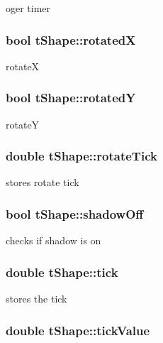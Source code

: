 oger timer \hypertarget{classt_shape_a502388884d8386251696471623158a76}{
\subsubsection[{rotated\-X}]{\setlength{\rightskip}{0pt plus 5cm}bool t\-Shape\-::rotated\-X}}\label{classt_shape_a502388884d8386251696471623158a76}
rotate\-X \hypertarget{classt_shape_a2bafbe715483f3f4da44eafae17aac5f}{
\subsubsection[{rotated\-Y}]{\setlength{\rightskip}{0pt plus 5cm}bool t\-Shape\-::rotated\-Y}}\label{classt_shape_a2bafbe715483f3f4da44eafae17aac5f}
rotate\-Y \hypertarget{classt_shape_ad7f4f8ddfe299bf838030cbc521acb6f}{
\subsubsection[{rotate\-Tick}]{\setlength{\rightskip}{0pt plus 5cm}double t\-Shape\-::rotate\-Tick}}\label{classt_shape_ad7f4f8ddfe299bf838030cbc521acb6f}
stores rotate tick \hypertarget{classt_shape_a7c8f00d63a58a51843de002a9652cac7}{
\subsubsection[{shadow\-Off}]{\setlength{\rightskip}{0pt plus 5cm}bool t\-Shape\-::shadow\-Off}}\label{classt_shape_a7c8f00d63a58a51843de002a9652cac7}
checks if shadow is on \hypertarget{classt_shape_a49dc22290f02a6e6ff0f106ffcb16083}{
\subsubsection[{tick}]{\setlength{\rightskip}{0pt plus 5cm}double t\-Shape\-::tick}}\label{classt_shape_a49dc22290f02a6e6ff0f106ffcb16083}
stores the tick \hypertarget{classt_shape_ad211ab24428076e438d6c9212cd0daa0}{
\subsubsection[{tick\-Value}]{\setlength{\rightskip}{0pt plus 5cm}double t\-Shape\-::tick\-Value}}\label{classt_shape_ad211ab24428076e438d6c9212cd0daa0}
